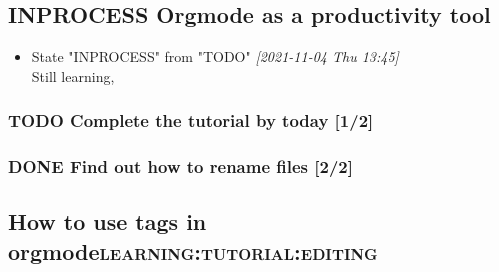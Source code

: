 \documentclass[11pt]{article}
\begin{document}
\subsection{INPROCESS Orgmode as a productivity tool}
\label{sec:orgc09cf65}
\begin{itemize}
\item State "INPROCESS"  from "TODO"       \textit{[2021-11-04 Thu 13:45] } \\
Still learning,
\end{itemize}
\subsubsection{{\bfseries\sffamily TODO} Complete the tutorial by today [1/2]}
\label{sec:org6a2b523}

\subsubsection{{\bfseries\sffamily DONE} Find out how to rename files [2/2]}
\label{sec:orgaa9d032}

\subsection{How to use tags in orgmode\hfill{}\textsc{learning:tutorial:editing}}
\label{sec:orgbaaece2}
\end{document}
